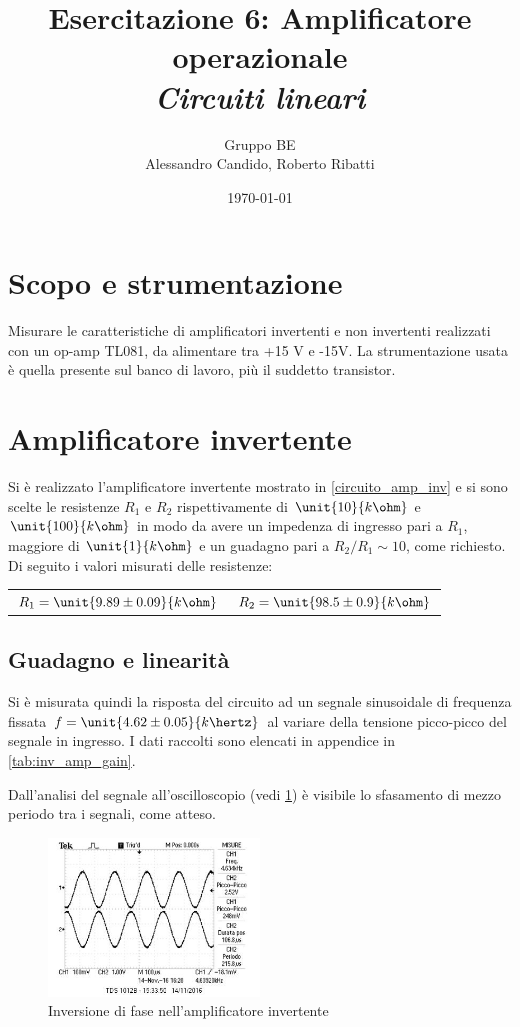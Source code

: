 \documentclass[10pt,a4paper]{article}
\title{Esercitazione 6: Amplificatore operazionale\\ \Large{\emph{Circuiti lineari}}}
\author{Gruppo BE \\ Alessandro Candido, Roberto Ribatti}
\date{\today}
\begin{document}
\maketitle

\section{Scopo e strumentazione}
Misurare le caratteristiche di amplificatori invertenti e non invertenti realizzati con un op-amp TL081, da alimentare tra +15 V e -15V.
La strumentazione usata è quella presente sul banco di lavoro, più il suddetto transistor.

\section{Amplificatore invertente}
Si è realizzato l'amplificatore invertente mostrato in \figurename{\ref{circuito_amp_inv}} e si sono scelte le resistenze $R_1$ e $R_2$ rispettivamente di $\unit{10}{k\ohm}$ e $\unit{100}{k\ohm}$ in modo da avere un impedenza di ingresso pari a $R_1$, maggiore di $\unit{1}{k\ohm}$ e un guadagno pari a $R_2/R_1 \sim 10$, come richiesto. Di seguito i valori misurati delle resistenze:

\begin{table}[h!]
	\centering
	\begin{tabular}{cc}
		$R_1 = \unit{9.89 \pm 0.09}{k\ohm}$  & $R_2 = \unit{98.5 \pm 0.9}{k\ohm}$
	\end{tabular}
\end{table}

\subsection{Guadagno e linearità}
Si è misurata quindi la risposta del circuito ad un segnale sinusoidale di frequenza fissata $f = \unit{4.62 \pm 0.05}{k\hertz}$ al variare della tensione picco-picco del segnale in ingresso. I dati raccolti sono elencati in appendice in \tablename{\ref{tab:inv_amp_gain}}.

Dall'analisi del segnale all'oscilloscopio (vedi \figurename{\ref{fig:inv_amp}}) è visibile lo sfasamento di mezzo periodo tra i segnali, come atteso.

\begin{figure}[h!]
	\centering
	\includegraphics[width=0.5\textwidth]{../oscilloscopio/dinverting.jpg}
	\caption{Inversione di fase nell'amplificatore invertente}
	\label{fig:inv_amp}
\end{figure}
\end{document}
